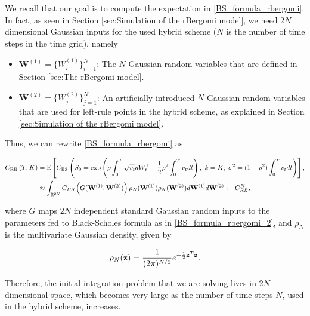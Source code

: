 We recall that our goal is to compute the expectation in \eqref{BS_formula_rbergomi}. In fact, as seen in Section \ref{sec:Simulation of the rBergomi model}, we need   $2N$ dimensional Gaussian inputs for the used  hybrid  scheme ($N$ is the number of time steps in  the time grid), namely
\begin{itemize}
	\item $\mathbf{W}^{(1)}=\{W^{(1)}_i\}_{i=1}^N$: The $N$ Gaussian random variables that are defined in Section  \ref{sec:The rBergomi model}.
	\item $\mathbf{W}^{(2)}=\{W^{(2)}_j\}_{j=1}^N$: An artificially introduced $N$ Gaussian random variables that are used for left-rule points in the hybrid scheme, as explained in Section  \ref{sec:Simulation of the rBergomi model}.
\end{itemize}

Thus, we can rewrite \eqref{BS_formula_rbergomi} as 


\begin{align}\label{BS_formula_rbergomi_2}
C_{\text{RB}}\left( T, K \right)&=\text{E}\left[C_{\text{BS}}\left( S_0 = \operatorname{exp}\left(\rho \int_0^T \sqrt{v_t} dW_t^1 - \frac{1}{2}
\rho^2 \int_0^T v_t dt\right),\ k = K, \ \sigma^2 = (1-\rho^2)
\int_0^T v_t dt \right) \right], \nonumber \\
&\approx \int_{\mathbb{R}^{2N}} C_{BS} \left(G(\mathbf{W}^{(1)},\mathbf{W}^{(2)})\right) \rho_{N}(\mathbf{W}^{(1)})  \rho_{N}(\mathbf{W}^{(2)}) d\mathbf{W}^{(1)} d\mathbf{W}^{(2)}:=C_{RB}^{N},
\end{align}

where $G$  maps  $2N$ independent standard Gaussian random inputs to the parameters fed to Black-Scholes formula as in \eqref{BS_formula_rbergomi_2}, and  $\rho_N$ is the multivariate Gaussian density, given by 

\begin{equation*}\label{eq: multivariate gaussian distribution}
\rho_N(\mathbf{z})=\frac{1}{(2 \pi)^{N/2}} e^{-\frac{1}{2} \mathbf{z}^T \mathbf{z}} .
\end{equation*} 

Therefore, the initial integration problem that we are solving lives in $2 N$-dimensional space, which becomes very large as the number of time steps $N$, used in the hybrid scheme, increases.


